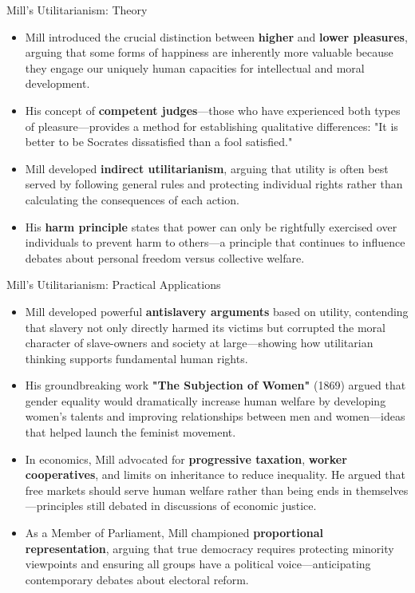 \documentclass[aspectratio=169]{beamer}
\begin{document}
\begin{frame}{Mill's Utilitarianism: Theory}
    \begin{itemize}
        \item Mill introduced the crucial distinction between \textbf{higher} and \textbf{lower pleasures}, arguing that some forms of happiness are inherently more valuable because they engage our uniquely human capacities for intellectual and moral development.
        
        \item His concept of \textbf{competent judges}—those who have experienced both types of pleasure—provides a method for establishing qualitative differences: "It is better to be Socrates dissatisfied than a fool satisfied."
        
        \item Mill developed \textbf{indirect utilitarianism}, arguing that utility is often best served by following general rules and protecting individual rights rather than calculating the consequences of each action.
        
        \item His \textbf{harm principle} states that power can only be rightfully exercised over individuals to prevent harm to others—a principle that continues to influence debates about personal freedom versus collective welfare.
        
    \end{itemize}
\end{frame}
\begin{frame}{Mill's Utilitarianism: Practical Applications}
    \begin{itemize}
        \item Mill developed powerful \textbf{antislavery arguments} based on utility, contending that slavery not only directly harmed its victims but corrupted the moral character of slave-owners and society at large—showing how utilitarian thinking supports fundamental human rights.
        
        \item His groundbreaking work \textbf{"The Subjection of Women"} (1869) argued that gender equality would dramatically increase human welfare by developing women's talents and improving relationships between men and women—ideas that helped launch the feminist movement.
        
        \item In economics, Mill advocated for \textbf{progressive taxation}, \textbf{worker cooperatives}, and limits on inheritance to reduce inequality. He argued that free markets should serve human welfare rather than being ends in themselves—principles still debated in discussions of economic justice.
        
        \item As a Member of Parliament, Mill championed \textbf{proportional representation}, arguing that true democracy requires protecting minority viewpoints and ensuring all groups have a political voice—anticipating contemporary debates about electoral reform.
        
    \end{itemize}
\end{frame}
\end{document}
